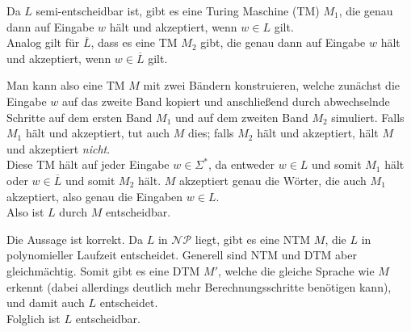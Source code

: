 \begin{teile}
	\item
	Da $L$ semi-entscheidbar ist, gibt es eine Turing Maschine (TM) $M_1$, die genau dann auf Eingabe $w$ hält und akzeptiert, wenn $w \in L$ gilt.\\
 	Analog gilt für $\overline{L}$, dass es eine TM $M_2$ gibt, die genau dann auf Eingabe $w$ hält und akzeptiert, wenn $w \in \overline{L}$ gilt.

	Man kann also eine TM $M$ mit zwei Bändern konstruieren, welche zunächst die Eingabe $w$ auf das zweite Band kopiert und anschließend durch abwechselnde Schritte auf dem ersten Band $M_1$ und auf dem zweiten Band $M_2$ simuliert. Falls $M_1$ hält und akzeptiert, tut auch $M$ dies; falls $M_2$ hält und akzeptiert, hält $M$ und akzeptiert \textit{nicht}.\\
	Diese TM hält auf jeder Eingabe $w \in \Sigma^*$, da entweder $w \in L$ und somit $M_1$ hält oder $w \in \overline{L}$ und somit $M_2$ hält. $M$ akzeptiert genau die Wörter, die auch $M_1$ akzeptiert, also genau die Eingaben $w \in L$.\\
	Also ist $L$ durch $M$ entscheidbar.
	
	\item	
	Die Aussage ist korrekt. Da $L$ in $\mathcal{NP}$ liegt, gibt es eine NTM $M$, die $L$ in polynomieller Laufzeit entscheidet. Generell sind NTM und DTM aber gleichmächtig. Somit gibt es eine DTM $M'$, welche die gleiche Sprache wie $M$ erkennt (dabei allerdings deutlich mehr Berechnungsschritte benötigen kann), und damit auch $L$ entscheidet.\\
	Folglich ist $L$ entscheidbar.
	
\end{teile}

\newpage
